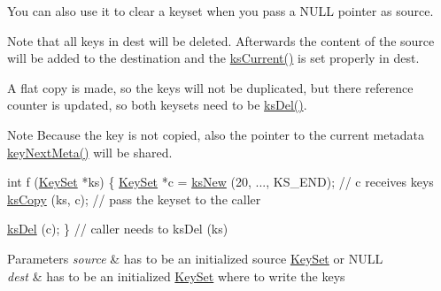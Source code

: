 You can also use it to clear a keyset when you pass a N\+U\+L\+L pointer as {\ttfamily source}.

Note that all keys in {\ttfamily dest} will be deleted. Afterwards the content of the source will be added to the destination and the \hyperlink{group__keyset_ga4287b9416912c5f2ab9c195cb74fb094}{ks\+Current()} is set properly in {\ttfamily dest}.

A flat copy is made, so the keys will not be duplicated, but there reference counter is updated, so both keysets need to be \hyperlink{group__keyset_ga27e5c16473b02a422238c8d970db7ac8}{ks\+Del()}.

\begin{DoxyNote}{Note}
Because the key is not copied, also the pointer to the current metadata \hyperlink{group__keymeta_ga4c88342f580a4291455a801af71ce048}{key\+Next\+Meta()} will be shared.
\end{DoxyNote}

\begin{DoxyCode}
\textcolor{keywordtype}{int} f (\hyperlink{classkdb_1_1KeySet_a4eac9850fa4f06c07a5306befc3e4377}{KeySet} *ks)
\{
        \hyperlink{classkdb_1_1KeySet_a4eac9850fa4f06c07a5306befc3e4377}{KeySet} *c = \hyperlink{group__keyset_ga671e1aaee3ae9dc13b4834a4ddbd2c3c}{ksNew} (20, ..., KS\_END);
        \textcolor{comment}{// c receives keys}
        \hyperlink{group__keyset_gaba1f1dbea191f4d7e7eb3e4296ae7d5e}{ksCopy} (ks, c); \textcolor{comment}{// pass the keyset to the caller}

        \hyperlink{group__keyset_ga27e5c16473b02a422238c8d970db7ac8}{ksDel} (c);
\}       \textcolor{comment}{// caller needs to ksDel (ks)}
\end{DoxyCode}



\begin{DoxyParams}{Parameters}
{\em source} & has to be an initialized source \hyperlink{classkdb_1_1KeySet}{Key\+Set} or N\+U\+L\+L \\
\hline
{\em dest} & has to be an initialized \hyperlink{classkdb_1_1KeySet}{Key\+Set} where to write the keys \\
\hline
\end{DoxyParams}

